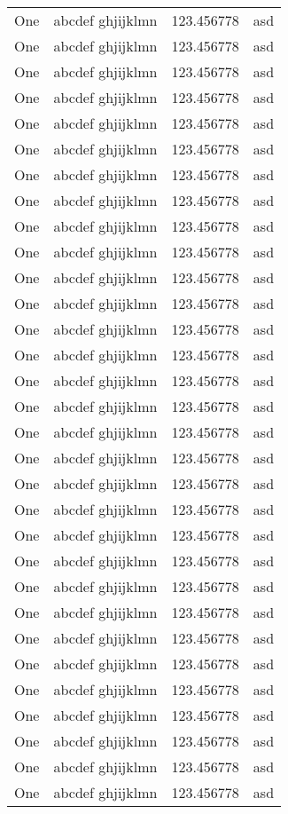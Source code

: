 \begin{longtable}{lXp{5cm}X}
	\rowcolordark One & abcdef ghjijklmn & 123.456778 & asd \\
	\rowcolorlight One & abcdef ghjijklmn & 123.456778 & asd \\
	\rowcolordark One & abcdef ghjijklmn & 123.456778 & asd \\
	\rowcolorlight One & abcdef ghjijklmn & 123.456778 & asd \\
	\rowcolordark One & abcdef ghjijklmn & 123.456778 & asd \\
	\rowcolorlight One & abcdef ghjijklmn & 123.456778 & asd \\
	\rowcolordark One & abcdef ghjijklmn & 123.456778 & asd \\
	\rowcolorlight One & abcdef ghjijklmn & 123.456778 & asd \\
	\rowcolordark One & abcdef ghjijklmn & 123.456778 & asd \\
	\rowcolorlight One & abcdef ghjijklmn & 123.456778 & asd \\
	\rowcolordark One & abcdef ghjijklmn & 123.456778 & asd \\
	\rowcolorlight One & abcdef ghjijklmn & 123.456778 & asd \\
	\rowcolordark One & abcdef ghjijklmn & 123.456778 & asd \\
	\rowcolorlight One & abcdef ghjijklmn & 123.456778 & asd \\
	\rowcolordark One & abcdef ghjijklmn & 123.456778 & asd \\
	\rowcolorlight One & abcdef ghjijklmn & 123.456778 & asd \\
	\rowcolordark One & abcdef ghjijklmn & 123.456778 & asd \\
	\rowcolorlight One & abcdef ghjijklmn & 123.456778 & asd \\
	\rowcolordark One & abcdef ghjijklmn & 123.456778 & asd \\
	\rowcolorlight One & abcdef ghjijklmn & 123.456778 & asd \\
	\rowcolordark One & abcdef ghjijklmn & 123.456778 & asd \\
	\rowcolorlight One & abcdef ghjijklmn & 123.456778 & asd \\
	\rowcolordark One & abcdef ghjijklmn & 123.456778 & asd \\
	\rowcolorlight One & abcdef ghjijklmn & 123.456778 & asd \\
	\rowcolordark One & abcdef ghjijklmn & 123.456778 & asd \\
	\rowcolorlight One & abcdef ghjijklmn & 123.456778 & asd \\
	\rowcolordark One & abcdef ghjijklmn & 123.456778 & asd \\
	\rowcolorlight One & abcdef ghjijklmn & 123.456778 & asd \\
	\rowcolordark One & abcdef ghjijklmn & 123.456778 & asd \\
	\rowcolorlight One & abcdef ghjijklmn & 123.456778 & asd \\
	\rowcolordark One & abcdef ghjijklmn & 123.456778 & asd \\
	
\end{longtable}
\endgroup